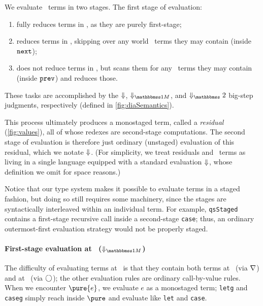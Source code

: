 \begin{abstrsyn}

We evaluate \lang\ terms in two stages. The first stage of evaluation:
\begin{enumerate}
\item fully reduces terms in \bbonep, as they are purely first-stage;
\item reduces terms in \bbonem, skipping over any world \bbtwo\ terms they may
contain (inside ${\tt next}$);
\item does not reduce terms in \bbtwo, but scans them for any \bbonem\ terms
they may contain (inside ${\tt prev}$) and reduces those.
\end{enumerate}
These tasks are accomplished by the ${\Downarrow}$, $\redonesym$, and $\redtwosym$
big-step judgments, respectively (defined in \ref{fig:diaSemantics}).

This process ultimately produces a monostaged term, called a \emph{residual}
(\ref{fig:values}), all of whose redexes are second-stage computations. The
second stage of evaluation is therefore just ordinary (unstaged) evaluation of
this residual, which we notate ${\Downarrow}$. (For simplicity, we treat residuals
and \bbonep\ terms as living in a single language equipped with a standard
evaluation ${\Downarrow}$, whose definition we omit for space reasons.)

Notice that our type system makes it possible to evaluate terms in a staged
fashion, but doing so still requires some machinery, since the stages are
syntactically interleaved within an individual term. For example,
\texttt{qsStaged} contains a first-stage recursive call inside a second-stage
\texttt{case}; thus, an ordinary outermost-first evaluation strategy would not
be properly staged.

\paragraph{First-stage evaluation at \bbonem\ ($\redonesym$)}
The difficulty of evaluating terms at \bbonem\ is that they contain both terms
at \bbonep\ (via $\nabla$) and at \bbtwo\ (via $\bigcirc$); the other evaluation
rules are ordinary call-by-value rules. When we encounter $\pure{e}$, we
evaluate $e$ as a monostaged term; \texttt{letg} and \texttt{caseg} simply reach
inside $\pure$ and evaluate like \texttt{let} and \texttt{case}.


\end{abstrsyn}
